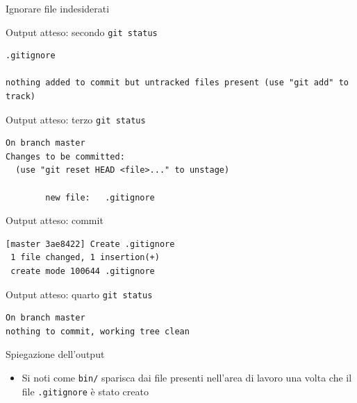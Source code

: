 \documentclass[xcolor=dvipsnames,presentation]{beamer}
\begin{document}
\begin{frame}{Ignorare file indesiderati}
\begin{block}{Output atteso: secondo \texttt{git status}}
\begin{Verbatim}[fontsize=\scriptsize]
        .gitignore

nothing added to commit but untracked files present (use "git add" to track)
        \end{Verbatim}
    \end{block}
    \begin{block}{Output atteso: terzo \texttt{git status}}
        \begin{Verbatim}[fontsize=\scriptsize]
On branch master
Changes to be committed:
  (use "git reset HEAD <file>..." to unstage)

        new file:   .gitignore

        \end{Verbatim}
    \end{block}
    \begin{block}{Output atteso: commit}
        \begin{Verbatim}[fontsize=\scriptsize]
[master 3ae8422] Create .gitignore
 1 file changed, 1 insertion(+)
 create mode 100644 .gitignore
        \end{Verbatim}
    \end{block}
    \begin{block}{Output atteso: quarto \texttt{git status}}
        \begin{Verbatim}[fontsize=\scriptsize]
On branch master
nothing to commit, working tree clean
        \end{Verbatim}
    \end{block}
    \begin{block}{Spiegazione dell'output}
        \begin{itemize}
            \item Si noti come \texttt{bin/} sparisca dai file presenti nell'area di lavoro una
volta che il file \texttt{.gitignore} è stato creato
        \end{itemize}
    \end{block}
\end{frame}
\end{document}
